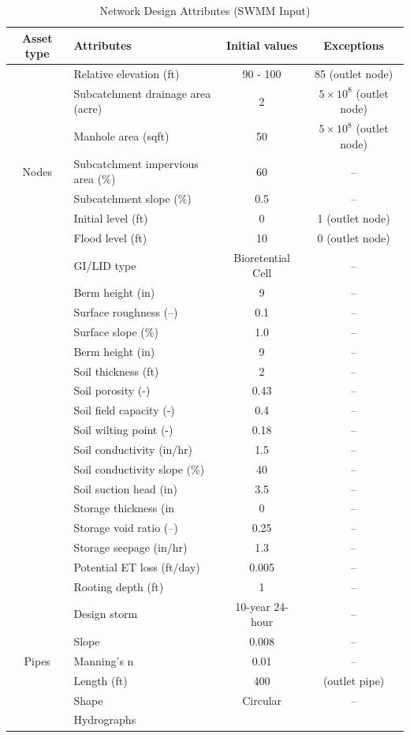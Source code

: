 \documentclass[draft]{agujournal2019}
\begin{document}
\begin{table}
 \caption{Network Design Attributes (SWMM Input)}
 \label{tab:SWMM}
 \centering
 \begin{tabular}{c l c c}
 \hline
Asset type & Attributes & Initial values & Exceptions \\
 \hline
& Relative elevation (ft) & 90 - 100 & 85 (outlet node) \\
& Subcatchment drainage area (acre) & 2 & $5\times 10^8$  (outlet node)\\
 & Manhole area (sqft) & 50 & $5\times 10^8$  (outlet node)\\
Nodes& Subcatchment impervious area (\%) & 60 & -- \\
& Subcatchment slope (\%) & 0.5 & -- \\
& Initial level	 (ft) & 0 & 1 (outlet node) \\
&Flood level (ft) & 10 & 0  (outlet node) \\
\hline
& GI/LID type & Bioretential Cell & -- \\
& Berm height (in) & 9 & -- \\
& Surface roughness (--) & 0.1 & -- \\
& Surface slope (\%) & 1.0 & -- \\
& Berm height (in) & 9 & -- \\
&Soil thickness	(ft) & 2 & -- \\
&Soil porosity (-) & 0.43 & --  \\ 
&Soil field capacity (-) & 0.4 & -- \\	
&Soil wilting point (-) & 0.18 & -- \\	
&Soil conductivity (in/hr) & 1.5 & -- \\	
&Soil conductivity slope (\%) & 40 & -- \\
&Soil suction head (in) & 3.5 & -- \\
& Storage thickness 	(in & 0 & --\\
&Storage void ratio (--) & 0.25 & -- \\	
&Storage seepage (in/hr) & 1.3 & -- \\	
&Potential ET loss (ft/day) &0.005  & --  \\	
&Rooting depth (ft) &1& -- \\	
\hline
&Design storm	& 10-year 24-hour & -- \\
&Slope & 0.008 & -- \\
Pipes &Manning’s n &0.01 & -- \\
&Length (ft) & 400 & (outlet pipe)\\
&Shape & Circular &  --\\
\hline
&Hydrographs & & \\
 \hline
 \end{tabular} \end{table}
 
\end{document}
